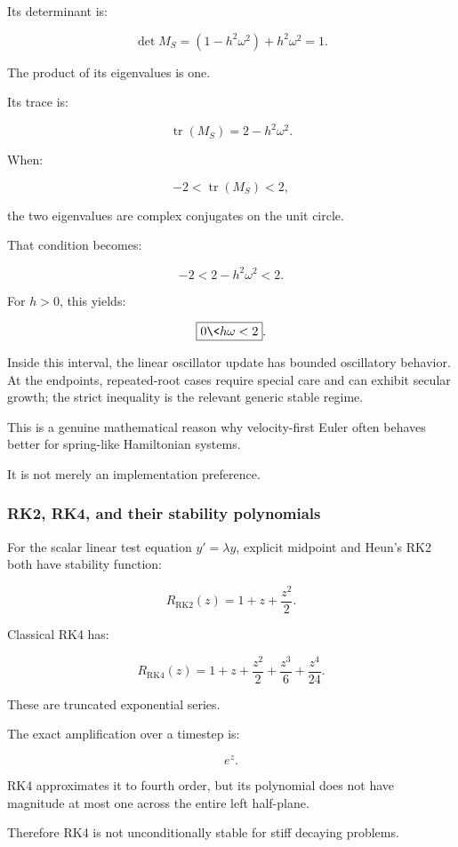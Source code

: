 Its determinant is:

\[
\det M_S =(1-h^2\omega^2)+h^2\omega^2=1.
\]

The product of its eigenvalues is one.

Its trace is:

\[
\operatorname{tr}(M_S)=2-h^2\omega^2.
\]

When:

\[
-2<\operatorname{tr}(M_S)<2,
\]

the two eigenvalues are complex conjugates on the unit circle.

That condition becomes:

\[
-2<2-h^2\omega^2<2.
\]

For \(h>0\), this yields:

\[
\boxed{0\<h\omega<2}.
\]

Inside this interval, the linear oscillator update has bounded oscillatory behavior. At the endpoints, repeated-root cases require special care and can exhibit secular growth; the strict inequality is the relevant generic stable regime.

This is a genuine mathematical reason why velocity-first Euler often behaves better for spring-like Hamiltonian systems.

It is not merely an implementation preference.

\subsubsection{RK2, RK4, and their stability polynomials}\label{02-foundations-ii-ch025-rk2-rk4-and-their-stability-polynomials}

For the scalar linear test equation \(y'=\lambda y\), explicit midpoint and Heun's RK2 both have stability function:

\[
\boxed{ R_{\mathrm{RK2}}(z)=1+z+\frac{z^2}{2} }.
\]

Classical RK4 has:

\[
\boxed{ R_{\mathrm{RK4}}(z)= 1+z+\frac{z^2}{2} +\frac{z^3}{6} +\frac{z^4}{24} }.
\]

These are truncated exponential series.

The exact amplification over a timestep is:

\[
e^z.
\]

RK4 approximates it to fourth order, but its polynomial does not have magnitude at most one across the entire left half-plane.

Therefore RK4 is not unconditionally stable for stiff decaying problems.

